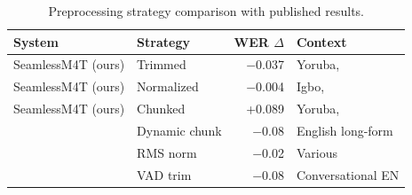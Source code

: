 
\begin{table}[t]
\centering
\small
\caption{Preprocessing strategy comparison with published results.}
\label{tab:p3_sota}
\begin{tabular}{llrl}
\toprule
\textbf{System} & \textbf{Strategy} & \textbf{WER $\Delta$} & \textbf{Context} \\
\midrule
SeamlessM4T (ours) & Trimmed & $-$0.037 & Yoruba, \dataAC{} \\
SeamlessM4T (ours) & Normalized & $-$0.004 & Igbo, \dataAC{} \\
SeamlessM4T (ours) & Chunked & +0.089 & Yoruba, \dataAC{} \\
\midrule
\citet{radford2023whisper} & Dynamic chunk & $-$0.08 & English long-form \\
\citet{watanabe2018espnet} & RMS norm & $-$0.02 & Various \\
\citet{zhu2022speech} & VAD trim & $-$0.08 & Conversational EN \\
\bottomrule
\end{tabular}
\end{table}
